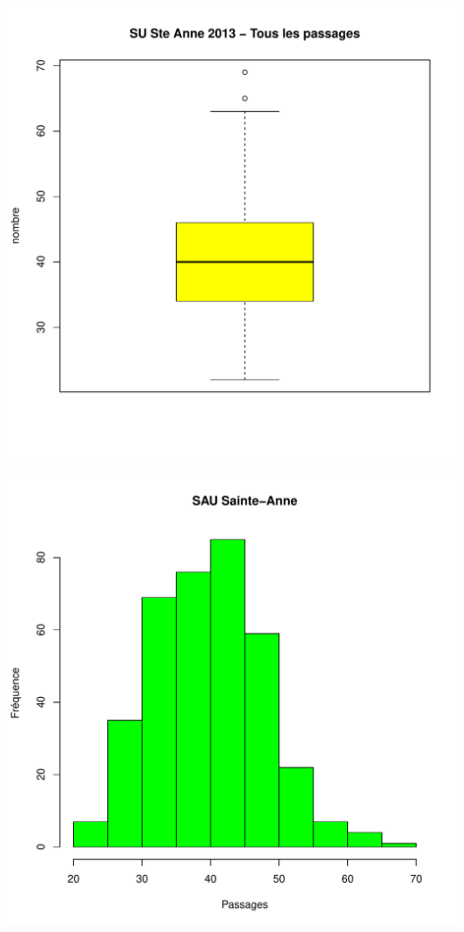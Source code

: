 \documentclass[12pt,english,french,twoside]{book}\usepackage[]{graphicx}\usepackage[]{color}
\makeatletter
\def\maxwidth{ %
  \ifdim\Gin@nat@width>\linewidth
    \linewidth
  \else
    \Gin@nat@width
  \fi
}
\makeatother
\begin{document}
\includegraphics[width=\maxwidth]{figure/stAnne_tot_passages-1} 

\includegraphics[width=\maxwidth]{figure/stAnne_tot_passages-2} 
\end{document}
